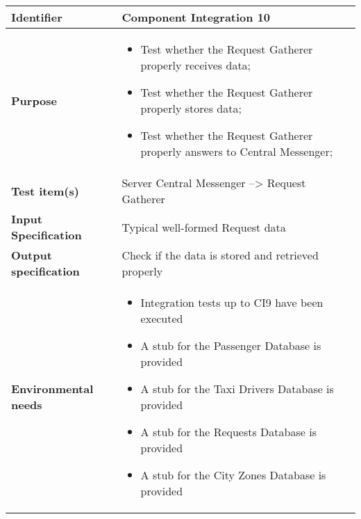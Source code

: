 \begin{center}
\begin{tabular}{lp{}}
\toprule
\textbf{Identifier}		&	Component Integration 10\\
\midrule
\textbf{Purpose}		&	\begin{itemize}
					\item Test whether the Request Gatherer properly receives data;
					\item Test whether the Request Gatherer properly stores data; 
					\item Test whether the Request Gatherer properly answers to Central Messenger;
					\end{itemize}	\\
\textbf{Test item(s)}	&	Server Central Messenger --> Request Gatherer\\
\textbf{Input Specification}	&	Typical well-formed Request data\\
\textbf{Output specification}	&	Check if the data is stored and retrieved properly\\
\textbf{Environmental needs}	&	\begin{itemize}
							\item Integration tests up to CI9 have been executed
							\item A stub for the Passenger Database is provided
							\item A stub for the Taxi Drivers Database is provided
							\item A stub for the Requests Database is provided
							\item A stub for the City Zones Database is provided
							\end{itemize}	\\
\bottomrule
\end{tabular}
\end{center}



